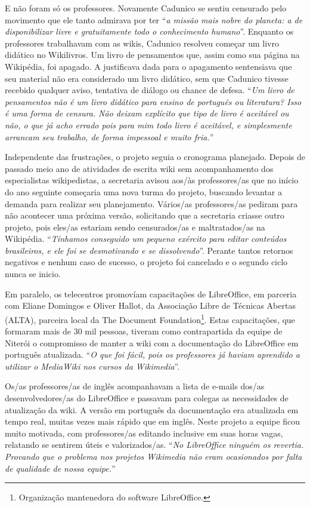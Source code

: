 E não foram só os professores. Novamente Cadunico se sentiu censurado pelo movimento que ele tanto admirava por ter ``\textit{a missão mais nobre do planeta: a de disponibilizar livre e gratuitamente todo o conhecimento humano}''. Enquanto os professores trabalhavam com as wikis, Cadunico resolveu começar um livro didático no Wikilivros. Um livro de pensamentos que, assim como sua página na Wikipédia, foi apagado. A justificava dada para o apagamento sentensiava que seu material não era considerado um livro didático, sem que Cadunico tivesse recebido qualquer aviso, tentativa de diálogo ou chance de defesa. ``\textit{Um livro de pensamentos não é um livro didático para ensino de português ou literatura? Isso é uma forma de censura. Não deixam explícito que tipo de livro é aceitável ou não, o que já acho errado pois para mim todo livro é aceitável, e simplesmente arrancam seu trabalho, de forma impessoal e muito fria.}''

Independente das frustrações, o projeto seguia o cronograma planejado. Depois de passado meio ano de atividades de escrita wiki sem acompanhamento dos especialistas wikipedistas, a secretaria avisou aos/às professores/as que no início do ano seguinte começaria uma nova turma do projeto, buscando levantar a demanda para realizar seu planejamento. Vários/as professores/as pediram para não acontecer uma próxima versão, solicitando que a secretaria criasse outro projeto, pois eles/as estariam sendo censurados/as e maltratados/as na Wikipédia. ``\textit{Tínhamos conseguido um pequeno exército para editar conteúdos brasileiros, e ele foi se desmotivando e se dissolvendo}''. Perante tantos retornos negativos e nenhum caso de sucesso, o projeto foi cancelado e o segundo ciclo nunca se inicio.

Em paralelo, os telecentros promovíam capacitações de LibreOffice, em parceria com Eliane Domingos e Oliver Hallot, da Associação Libre de Técnicas Abertas (ALTA), parceira local da The Document Foundation\footnote{Organização mantenedora do software LibreOffice.}. Estas capacitações, que formaram mais de 30 mil pessoas, tiveram como contrapartida da equipe de Niterói o compromisso de manter a wiki com a documentação do LibreOffice em português atualizada. ``\textit{O que foi fácil, pois os professores já haviam aprendido a utilizar o MediaWiki nos cursos da Wikimedia}''.

Os/as professores/as de inglês acompanhavam a lista de e-mails dos/as desenvolvedores/as do LibreOffice e passavam para colegas as necessidades de atualização da wiki. A versão em português da documentação era atualizada em tempo real, muitas vezes mais rápido que em inglês. Neste projeto a equipe ficou muito motivada, com professores/as editando inclusive em suas horas vagas, relatando se sentirem úteis e valorizados/as. ``\textit{No LibreOffice ninguém os revertia. Provando que o problema nos projetos Wikimedia não eram ocasionados por falta de qualidade de nossa equipe.}'' \citep{cadunico_2020}